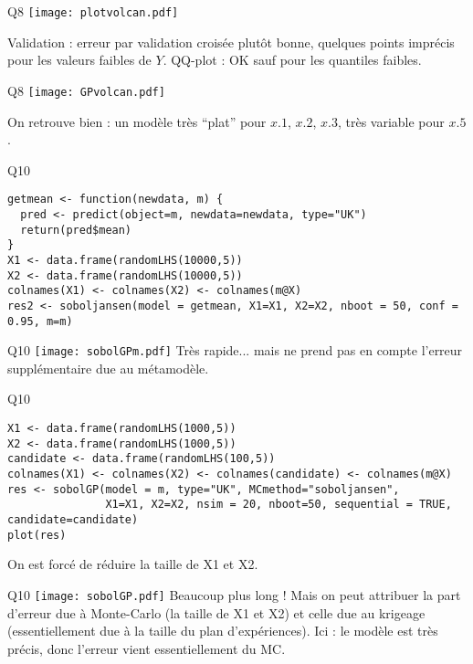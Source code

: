 \documentclass{beamer}
\begin{document}
\begin{frame}[fragile]{Q8}
\texttt{[image: plotvolcan.pdf]} 

Validation : erreur par validation croisée plutôt bonne, quelques points imprécis pour les valeurs faibles de $Y$. QQ-plot : OK sauf pour les quantiles faibles.

\end{frame}
\begin{frame}[fragile]{Q8}
\texttt{[image: GPvolcan.pdf]} 

On retrouve bien : un modèle très ``plat'' pour $x.1$, $x.2$, $x.3$, très variable pour $x.5$.
\end{frame}
\begin{frame}[fragile]{Q10}
 \begin{Verbatim}[fontsize=\tiny]
getmean <- function(newdata, m) {
  pred <- predict(object=m, newdata=newdata, type="UK")
  return(pred$mean)
}
X1 <- data.frame(randomLHS(10000,5))
X2 <- data.frame(randomLHS(10000,5))
colnames(X1) <- colnames(X2) <- colnames(m@X)
res2 <- soboljansen(model = getmean, X1=X1, X2=X2, nboot = 50, conf = 0.95, m=m)
\end{Verbatim}
\end{frame}
\begin{frame}[fragile]{Q10}
\texttt{[image: sobolGPm.pdf]} 
Très rapide... mais ne prend pas en compte l'erreur supplémentaire due au métamodèle.
\end{frame}
\begin{frame}[fragile]{Q10}
 \begin{Verbatim}[fontsize=\tiny]
X1 <- data.frame(randomLHS(1000,5))
X2 <- data.frame(randomLHS(1000,5))
candidate <- data.frame(randomLHS(100,5))
colnames(X1) <- colnames(X2) <- colnames(candidate) <- colnames(m@X)
res <- sobolGP(model = m, type="UK", MCmethod="soboljansen",
               X1=X1, X2=X2, nsim = 20, nboot=50, sequential = TRUE, candidate=candidate)
plot(res)
\end{Verbatim}
On est forcé de réduire la taille de X1 et X2.
\end{frame}
\begin{frame}[fragile]{Q10}
\texttt{[image: sobolGP.pdf]} 
Beaucoup plus long ! Mais on peut attribuer la part d'erreur due à Monte-Carlo (la taille de X1 et X2) et celle due au krigeage (essentiellement due à la taille du plan d'expériences).
Ici : le modèle est très précis, donc l'erreur vient essentiellement du MC.
\end{frame}
\end{document}

